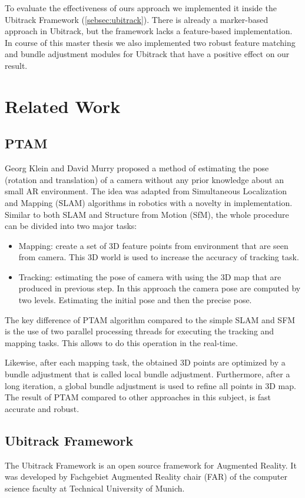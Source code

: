 To evaluate the effectiveness of ours approach we implemented it inside the Ubitrack Framework (\autoref{sebsec:ubitrack}). There is already a marker-based approach in Ubitrack, but the framework lacks a feature-based implementation. In course of this master thesis we also implemented two robust feature matching and bundle adjustment modules for Ubitrack that have a positive effect on our result.

\section{Related Work}
\subsection{PTAM}
Georg Klein and David Murry \cite{klein2007parallel} proposed a method of estimating the pose (rotation and translation) of a camera without any prior knowledge about an small AR environment. The idea was adapted from Simultaneous Localization and Mapping (SLAM) algorithms in robotics with a novelty in implementation. Similar to both SLAM and Structure from Motion (SfM), the whole procedure can be divided into two major tasks:
\begin{itemize}
\item Mapping: create a set of 3D feature points from environment that are seen from camera. This 3D world is used to increase the accuracy of tracking task.
\item Tracking: estimating the pose of camera with using the 3D map that are produced in previous step. In this approach the camera pose are computed by two levels. Estimating the initial pose and then the precise pose.
\end{itemize}
The key difference of PTAM algorithm compared to the simple SLAM and SFM is the use of two parallel processing threads for executing the tracking and mapping tasks. This allows to do this operation in the real-time.

Likewise, after each mapping task, the obtained 3D points are optimized by a bundle adjustment that is called local bundle adjustment. Furthermore, after a long iteration, a global bundle adjustment is used to refine all points in 3D map. The result of PTAM compared to other approaches in this subject, is fast accurate and robust.

\subsection{Ubitrack Framework} \label{sebsec:ubitrack}
The Ubitrack Framework is an open source framework for Augmented Reality. It was developed by Fachgebiet Augmented Reality chair (FAR) of the computer science faculty at Technical University of Munich.

